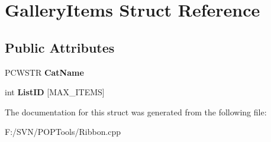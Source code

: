 \hypertarget{struct_gallery_items}{\section{Gallery\-Items Struct Reference}
\label{struct_gallery_items}
}
\subsection*{Public Attributes}
\begin{DoxyCompactItemize}
\item 
\hypertarget{struct_gallery_items_a03fb209bb15ac994d47a4ab31fb7efbf}{P\-C\-W\-S\-T\-R {\bfseries Cat\-Name}}\label{struct_gallery_items_a03fb209bb15ac994d47a4ab31fb7efbf}

\item 
\hypertarget{struct_gallery_items_a581003b5818ef5b1e49f4889da48e43c}{int {\bfseries List\-I\-D} \mbox{[}M\-A\-X\-\_\-\-I\-T\-E\-M\-S\mbox{]}}\label{struct_gallery_items_a581003b5818ef5b1e49f4889da48e43c}

\end{DoxyCompactItemize}


The documentation for this struct was generated from the following file\-:\begin{DoxyCompactItemize}
\item 
F\-:/\-S\-V\-N/\-P\-O\-P\-Tools/Ribbon.\-cpp\end{DoxyCompactItemize}
